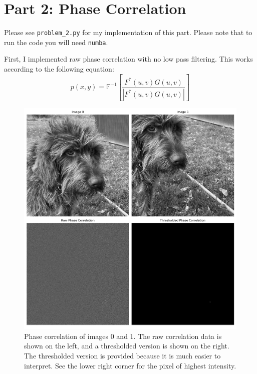 \documentclass[]{article}
\begin{document}
	\section{Part 2: Phase Correlation}
	Please see \texttt{problem\_2.py} for my implementation of this part. Please note that to run the code you will need \texttt{numba}. 
	
	First, I implemented raw phase correlation with no low pass filtering. This works according to the following equation:
	\[p(x, y)=\mathbb{F}^{-1}\left[\frac{F^{*}(u, v) G(u, v)}{\left|F^{*}(u, v) G(u, v)\right|}\right]\]
	
	\begin{figure}[H]
		\centering
		\includegraphics[width=6.5in]{p2_output/phase_correlation_raw.png}
		\caption{Phase correlation of images 0 and 1. The raw correlation data is shown on the left, and a thresholded version is shown on the right. The thresholded version is provided because it is much easier to interpret. See the lower right corner for the pixel of highest intensity.}
	\end{figure}
	
\end{document}
